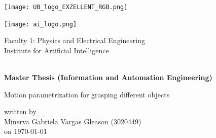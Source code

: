 

\begin{titlepage}

\scshape %
\begin{minipage}{0.6\linewidth}
\texttt{[image: UB\_logo\_EXZELLENT\_RGB.png]}
\end{minipage}
\hfill
\begin{minipage}{0.4\linewidth}
\begin{flushright}
\texttt{[image: ai\_logo.png]}
\end{flushright}
\end{minipage}
\vspace{10pt}
\begin{center}
Faculty 1: Physics and Electrical Engineering  \\
Institute for Artificial Intelligence
\end{center}

\centering
\vspace{-1cm}~~\\

\textbf{\small Master Thesis (Information and Automation Engineering)}\\
\vspace{0.5cm}

\Large   Motion parametrization for grasping different objects
 \\
\vspace{1cm}

\normalsize
\begin{center}
written by \\ Minerva Gabriela Vargas Gleason (3020449) \\on \today  %
\end{center}

\vspace{1cm}


\end{titlepage}
